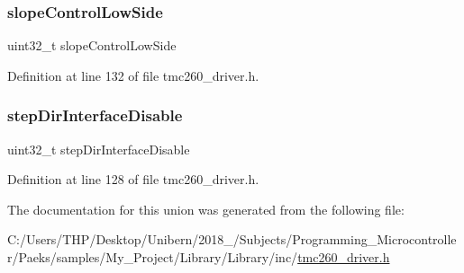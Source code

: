 \subsubsection{\texorpdfstring{slope\+Control\+Low\+Side}{slopeControlLowSide}}
{\footnotesize\ttfamily uint32\+\_\+t slope\+Control\+Low\+Side}



Definition at line 132 of file tmc260\+\_\+driver.\+h.

\mbox{\label{uniontmc260___driver_configuration_register___a912e153026c0015a0a66ceb21633866b}} 
\subsubsection{\texorpdfstring{step\+Dir\+Interface\+Disable}{stepDirInterfaceDisable}}
{\footnotesize\ttfamily uint32\+\_\+t step\+Dir\+Interface\+Disable}



Definition at line 128 of file tmc260\+\_\+driver.\+h.



The documentation for this union was generated from the following file\+:\begin{DoxyCompactItemize}
\item 
C\+:/\+Users/\+T\+H\+P/\+Desktop/\+Unibern/2018\+\_/\+Subjects/\+Programming\+\_\+\+Microcontroller/\+Paeks/samples/\+My\+\_\+\+Project/\+Library/\+Library/inc/\mbox{\hyperlink{tmc260__driver_8h}{tmc260\+\_\+driver.\+h}}\end{DoxyCompactItemize}
